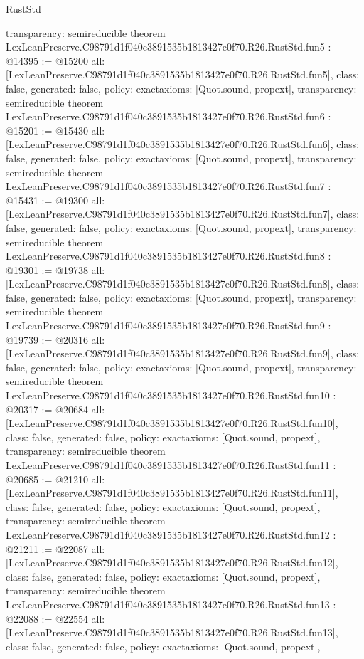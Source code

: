\begin{lexlean}{RustStd}
\begin{coremodule}
{  transparency: semireducible
}
theorem LexLeanPreserve.C98791d1f040c3891535b1813427e0f70.R26.RustStd.fun5 : @14395 := @15200 {
  all: [LexLeanPreserve.C98791d1f040c3891535b1813427e0f70.R26.RustStd.fun5],
  class: false,
  generated: false,
  policy: exact{axioms: [Quot.sound, propext]},
  transparency: semireducible
}
theorem LexLeanPreserve.C98791d1f040c3891535b1813427e0f70.R26.RustStd.fun6 : @15201 := @15430 {
  all: [LexLeanPreserve.C98791d1f040c3891535b1813427e0f70.R26.RustStd.fun6],
  class: false,
  generated: false,
  policy: exact{axioms: [Quot.sound, propext]},
  transparency: semireducible
}
theorem LexLeanPreserve.C98791d1f040c3891535b1813427e0f70.R26.RustStd.fun7 : @15431 := @19300 {
  all: [LexLeanPreserve.C98791d1f040c3891535b1813427e0f70.R26.RustStd.fun7],
  class: false,
  generated: false,
  policy: exact{axioms: [Quot.sound, propext]},
  transparency: semireducible
}
theorem LexLeanPreserve.C98791d1f040c3891535b1813427e0f70.R26.RustStd.fun8 : @19301 := @19738 {
  all: [LexLeanPreserve.C98791d1f040c3891535b1813427e0f70.R26.RustStd.fun8],
  class: false,
  generated: false,
  policy: exact{axioms: [Quot.sound, propext]},
  transparency: semireducible
}
theorem LexLeanPreserve.C98791d1f040c3891535b1813427e0f70.R26.RustStd.fun9 : @19739 := @20316 {
  all: [LexLeanPreserve.C98791d1f040c3891535b1813427e0f70.R26.RustStd.fun9],
  class: false,
  generated: false,
  policy: exact{axioms: [Quot.sound, propext]},
  transparency: semireducible
}
theorem LexLeanPreserve.C98791d1f040c3891535b1813427e0f70.R26.RustStd.fun10 : @20317 := @20684 {
  all: [LexLeanPreserve.C98791d1f040c3891535b1813427e0f70.R26.RustStd.fun10],
  class: false,
  generated: false,
  policy: exact{axioms: [Quot.sound, propext]},
  transparency: semireducible
}
theorem LexLeanPreserve.C98791d1f040c3891535b1813427e0f70.R26.RustStd.fun11 : @20685 := @21210 {
  all: [LexLeanPreserve.C98791d1f040c3891535b1813427e0f70.R26.RustStd.fun11],
  class: false,
  generated: false,
  policy: exact{axioms: [Quot.sound, propext]},
  transparency: semireducible
}
theorem LexLeanPreserve.C98791d1f040c3891535b1813427e0f70.R26.RustStd.fun12 : @21211 := @22087 {
  all: [LexLeanPreserve.C98791d1f040c3891535b1813427e0f70.R26.RustStd.fun12],
  class: false,
  generated: false,
  policy: exact{axioms: [Quot.sound, propext]},
  transparency: semireducible
}
theorem LexLeanPreserve.C98791d1f040c3891535b1813427e0f70.R26.RustStd.fun13 : @22088 := @22554 {
  all: [LexLeanPreserve.C98791d1f040c3891535b1813427e0f70.R26.RustStd.fun13],
  class: false,
  generated: false,
  policy: exact{axioms: [Quot.sound, propext]},
}
\end{coremodule}
\end{lexlean}
